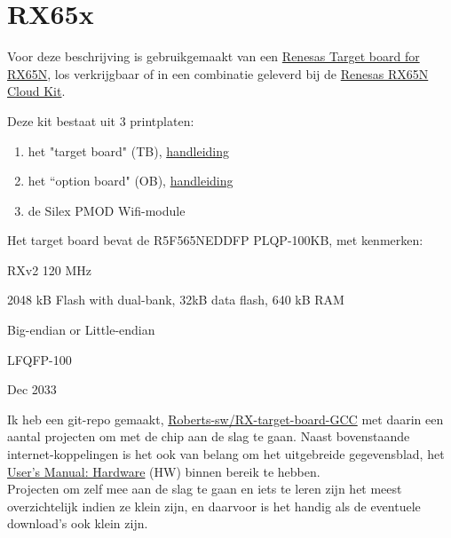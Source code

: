 \documentclass[a4paper, 11pt, fleqn, twoside]{scrartcl}%
\renewenvironment{description}[1][1em]%
 {\list{}{\labelwidth=0pt \leftmargin=#1
  \let\makelabel\descriptionlabel}}
 {\endlist}
\begin{document}
\pagestyle{RvLpagina}

\section{RX65x}
Voor deze beschrijving is gebruikgemaakt van een 
\href{https://www.renesas.com/eu/en/products/software-tools/boards-and-kits/eval-kits/rx-family-target-board.html}{Renesas Target board for RX65N}, los verkrijgbaar of in een combinatie 
geleverd bij de
\href{https://www.renesas.com/eu/en/products/software-tools/boards-and-kits/eval-kits/rx65n-cloud-kit.html}{Renesas RX65N Cloud Kit}.

Deze kit bestaat uit 3 printplaten:
\begin{enumerate}
\item het "target board" (TB),
 \href{https://www.renesas.com/en-eu/doc/products/mpumcu/doc/rx_family/r12um0038ej0100-cloud.pdf}{handleiding}
\item het ``option board" (OB),
 \href{https://www.renesas.com/en-eu/doc/products/mpumcu/doc/rx_family/001/r12um0039eg0100-cloud.pdf}{handleiding}
\item de Silex PMOD Wifi-module
\end{enumerate}

Het target board bevat de R5F565NEDDFP PLQP-100KB, met kenmerken:
\begin{description}[1.2em]
\item[core] RXv2 120 MHz
\item[memory] 2048 kB Flash with dual-bank, 32kB data flash, 640 kB RAM
\item[Endian-setting] Big-endian or Little-endian
\item[package] LFQFP-100
\item[last buy] Dec 2033
\end{description}

Ik heb een git-repo gemaakt,
\href{https://github.com/Roberts-sw/RX-target-board-GCC}{Roberts-sw/RX-target-board-GCC} 
met daarin een aantal projecten om met de chip aan de slag te gaan.
Naast bovenstaande internet-koppelingen is het ook van belang om het 
uitgebreide gegevensblad, het
\href{https://www.renesas.com/eu/en/doc/products/mpumcu/doc/rx_family/001/r01uh0590ej0230-rx651.pdf}{User's Manual: Hardware} 
(HW) binnen bereik te hebben.\\[1ex]
Projecten om zelf mee aan de slag te gaan en iets te leren zijn het meest 
overzichtelijk indien ze klein zijn, en daarvoor is het handig als de 
eventuele download's ook klein zijn.
\end{document}
